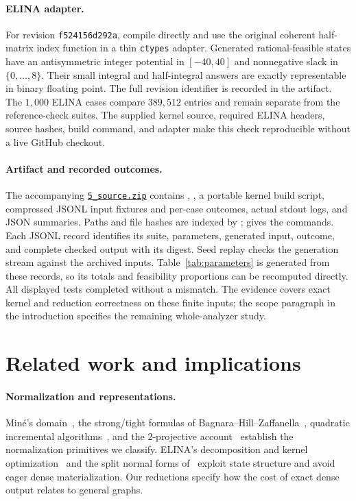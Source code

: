 \documentclass[manuscript,11pt,screen,nonacm]{acmart}
\theoremstyle{definition}
\begin{document}
\paragraph{ELINA adapter.}
For revision \texttt{f524156d292a}, compile  directly and use the original coherent half-matrix index function in a thin \texttt{ctypes} adapter. Generated rational-feasible states have an antisymmetric integer potential in $[-40,40]$ and nonnegative slack in $\{0,\ldots,8\}$. Their small integral and half-integral answers are exactly representable in binary floating point. The full revision identifier is recorded in the artifact. The $1{,}000$ ELINA cases compare $389{,}512$ entries and remain separate from the reference-check suites. The supplied kernel source, required ELINA headers, source hashes, build command, and adapter make this check reproducible without a live GitHub checkout.

\paragraph{Artifact and recorded outcomes.}
The accompanying \href{run:5_source.zip}{\texttt{5\_source.zip}} contains , , a portable kernel build script, compressed JSONL input fixtures and per-case outcomes, actual stdout logs, and JSON summaries. Paths and file hashes are indexed by ;  gives the commands. Each JSONL record identifies its suite, parameters, generated input, outcome, and complete checked output with its digest. Seed replay checks the generation stream against the archived inputs. Table~\ref{tab:parameters} is generated from these records, so its totals and feasibility proportions can be recomputed directly. All displayed tests completed without a mismatch. The evidence covers exact kernel and reduction correctness on these finite inputs; the scope paragraph in the introduction specifies the remaining whole-analyzer study.

\section{Related work and implications}\label{sec:related}
\paragraph{Normalization and representations.}
Min\'e's domain~\cite{mine2006}, the strong/tight formulas of Bagnara--Hill--Zaffanella~\cite{bhz2008,bhz2009}, quadratic incremental algorithms~\cite{crk2019}, and the 2-projective account~\cite{schwarz2023} establish the normalization primitives we classify. ELINA's decomposition and kernel optimization~\cite{spv2015} and the split normal forms of~\cite{gange2016,gange2021} exploit state structure and avoid eager dense materialization. Our reductions specify how the cost of exact dense output relates to general graphs.
\end{document}
